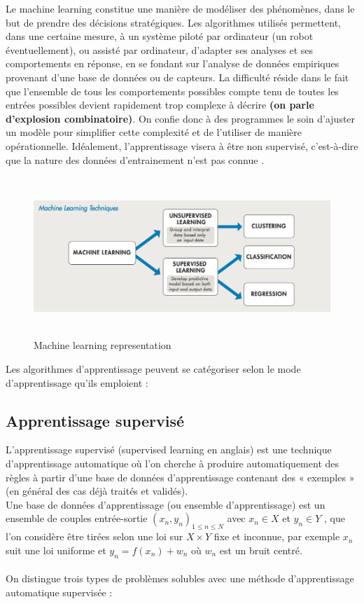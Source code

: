 \documentclass[12pt, french]{report}
\begin{document}
Le machine learning constitue une manière de modéliser des phénomènes, dans le but de prendre des décisions stratégiques. Les algorithmes utilisés permettent, dans une certaine mesure, à un système piloté par ordinateur (un robot éventuellement), ou assisté par ordinateur, d'adapter ses analyses et ses comportements en réponse, en se fondant sur l'analyse de données empiriques provenant d'une base de données ou de capteurs. La difficulté réside dans le fait que l'ensemble de tous les comportements possibles compte tenu de toutes les entrées possibles devient rapidement trop complexe à décrire \textbf{(on parle d'explosion combinatoire)}. On confie donc à des programmes le soin d'ajuster un modèle pour simplifier cette complexité et de l'utiliser de manière opérationnelle. Idéalement, l'apprentissage visera à être non supervisé, c'est-à-dire que la nature des données d'entrainement n'est pas connue \cite{key13}.
\begin{figure}[h]
\includegraphics[width=15cm, height=6cm]{images/machinelearning.png}
\caption{Machine learning representation \cite{key24}}
\label{machinelearning}
\end{figure}

Les algorithmes d'apprentissage peuvent se catégoriser selon le mode d'apprentissage qu'ils emploient :

\subsection{Apprentissage supervisé}
L'apprentissage supervisé (supervised learning en anglais) est une technique d'apprentissage automatique où l'on cherche à produire automatiquement des règles à partir d'une base de données d'apprentissage contenant des « exemples » (en général des cas déjà traités et validés).\\
Une base de données d'apprentissage (ou ensemble d'apprentissage) est un ensemble de couples entrée-sortie $(x_n, y_n)_{1 \leq n \leq N}$ avec $x_n \in X$ et $y_n \in Y $  , que l'on considère être tirées selon une loi sur $ X \times Y $ fixe et inconnue, par exemple $x_n$ suit une loi uniforme et $ y_n = f(x_n) + w_n$ où $w_n$ est un bruit centré. \\\\
On distingue trois types de problèmes solubles avec une méthode d'apprentissage automatique supervisée \cite{key14}:  
\end{document}
